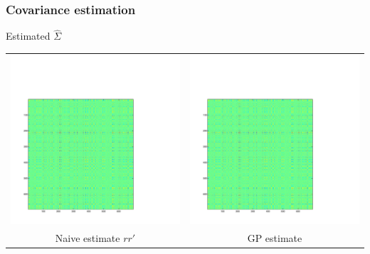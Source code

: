 \documentclass{beamer}
\begin{document}
\begin{frame}
\frametitle{Covariance estimation}
Estimated $\hat{\Sigma}$
\begin{tabular}{cc}
\includegraphics[scale=0.2]{ex2_data2_cov1.pdf} & 
\includegraphics[scale=0.2]{ex2_data2_cov1.pdf}\\
Naive estimate $rr'$ & GP estimate 
\end{tabular}
\end{frame}
\end{document}
